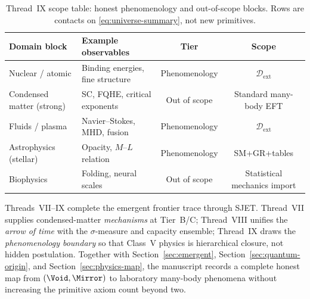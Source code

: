 \begin{table}[ht]
\centering
\small
\renewcommand{\arraystretch}{1.08}
\begin{tabular}{@{}llcc@{}}
\toprule
\textbf{Domain block} & \textbf{Example observables} &
\textbf{Tier} & \textbf{Scope} \\
\midrule
Nuclear / atomic &
  Binding energies, fine structure &
  Phenomenology &
  $\mathcal{D}_{\mathrm{ext}}$ \\
Condensed matter (strong) &
  SC, FQHE, critical exponents &
  Out of scope &
  Standard many-body EFT \\
Fluids / plasma &
  Navier--Stokes, MHD, fusion &
  Phenomenology &
  $\mathcal{D}_{\mathrm{ext}}$ \\
Astrophysics (stellar) &
  Opacity, $M$--$L$ relation &
  Phenomenology &
  SM+GR+tables \\
Biophysics &
  Folding, neural scales &
  Out of scope &
  Statistical mechanics import \\
\bottomrule
\end{tabular}
\caption{Thread~IX scope table: honest phenomenology and out-of-scope blocks.
Rows are contacts on \eqref{eq:universe-summary}, not new primitives.}
\label{tab:thread-9-scope}
\end{table}

\begin{remark}\label{rmk:thread-7-9-closure}
Threads~VII--IX complete the emergent frontier trace through SJET.
Thread~VII supplies condensed-matter \emph{mechanisms} at Tier~B/C;
Thread~VIII unifies the \emph{arrow of time} with the $\sigma$-measure and
capacity ensemble; Thread~IX draws the \emph{phenomenology boundary} so that
Class~V physics is hierarchical closure, not hidden postulation. Together with
Section~\ref{sec:emergent}, Section~\ref{sec:quantum-origin}, and
Section~\ref{sec:physics-map}, the manuscript records a complete honest map from
$(\Void,\Mirror)$ to laboratory many-body phenomena without increasing the
primitive axiom count beyond two.
\end{remark}